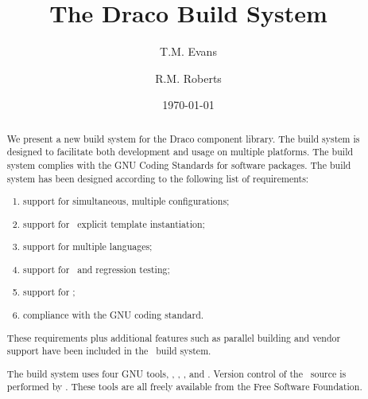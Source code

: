 \documentclass[reqno]{larep}
\begin{document}

\frontmatter

\title{The Draco Build System}
\author{T.M. Evans}
\author{R.M. Roberts}
\address{X--TM, MS D409, Los Alamos National Laboratory, Los Alamos, NM
  87544}

\date{\today}


\begin{abstract}
  
  We present a new build system for the Draco component library.  The
  build system is designed to facilitate both development and usage on 
  multiple platforms.  The build system complies with the GNU Coding
  Standards for software packages.  The build system has been designed 
  according to the following list of requirements:
  \begin{enumerate}
  \item support for simultaneous, multiple configurations;
  \item support for \cpp\ explicit template instantiation;
  \item support for multiple languages;
  \item support for \dejagnu\ and regression testing;
  \item support for \purify;
  \item compliance with the GNU coding standard.
  \end{enumerate}
  These requirements plus additional features such as parallel
  building and vendor support have been included in the \draco\ build
  system. 
  
  The build system uses four GNU tools, \autoconf, \gmake, \gmfour,
  and \dejagnu.  Version control of the \draco\ source is performed by
  \cvs.  These tools are all freely available from the Free Software
  Foundation.

\end{abstract}
\maketitle

\tableofcontents
\listoffigures
\listoftables

\end{document}
